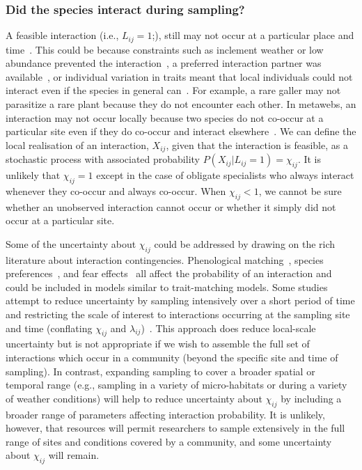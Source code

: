 \documentclass[12pt]{article}
\begin{document}
\begin{spacing}{2.0}
        \subsubsection*{Did the species interact during sampling?} 

          A feasible interaction (i.e., $L_{ij}=1$;), still may not occur at a particular place and time~\citep{Poisot2015}. This could be because constraints such as inclement weather or low abundance prevented the interaction~\citep{Jordano2016}, a preferred interaction partner was available~\citep{Weinstein2017a}, or individual variation in traits meant that local individuals could not interact even if the species in general can~\citep{Gravel2013,Wells2013,Poisot2015}. For example, a rare galler may not parasitize a rare plant because they do not encounter each other. In metawebs, an interaction may not occur locally because two species do not co-occur at a particular site even if they do co-occur and interact elsewhere~\citep{Graham2018}. We can define the local realisation of an interaction, $X_{ij}$, given that the interaction is feasible, as a stochastic process with associated probability $P(X_{ij}|L_{ij}=1)=\chi_{ij}$. It is unlikely that $\chi_{ij}=1$  except in the case of obligate specialists who always interact whenever they co-occur and always co-occur. When $\chi_{ij}<1$, we cannot be sure whether an unobserved interaction cannot occur or whether it simply did not occur at a particular site.


          Some of the uncertainty about $\chi_{ij}$ could be addressed by drawing on the rich literature about interaction contingencies. Phenological matching~\citep{MillerRushing2010}, species preferences~\citep{Pires2011a,Novak2015}, and fear effects~\citep{Luttbeg2005} all affect the probability of an interaction and could be included in models similar to trait-matching models. Some studies attempt to reduce uncertainty by sampling intensively over a short period of time and restricting the scale of interest to interactions occurring at the sampling site and time (conflating $\chi_{ij}$ and $\lambda_{ij}$)~\citep{Bartomeus2013,Weinstein2017a}. This approach does reduce local-scale uncertainty but is not appropriate if we wish to assemble the full set of interactions which occur in a community (beyond the specific site and time of sampling). In contrast, expanding sampling to cover a broader spatial or temporal range (e.g., sampling in a variety of micro-habitats or during a variety of weather conditions) will help to reduce uncertainty about $\chi_{ij}$ by including a broader range of parameters affecting interaction probability. It is unlikely, however, that resources will permit researchers to sample extensively in the full range of sites and conditions covered by a community, and some uncertainty about $\chi_{ij}$ will remain.


\end{spacing}
\end{document}
